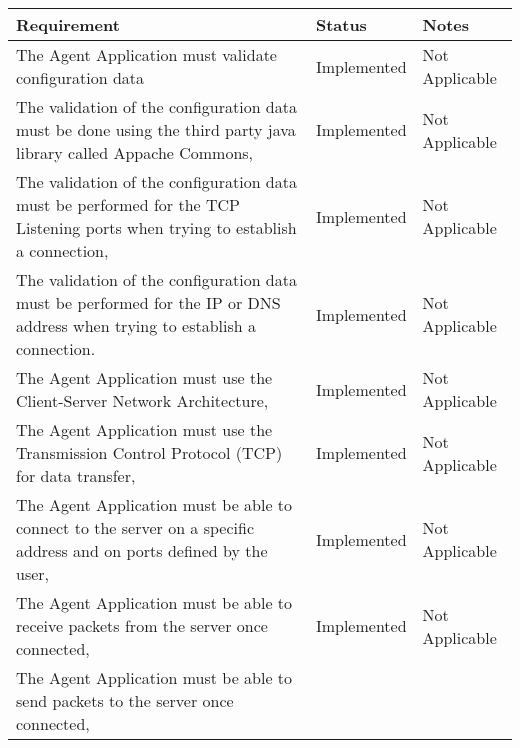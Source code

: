 \noindent
\begin{longtable}{
|p{}%
|p{}%
|p{}|%
}
    \hline
    \centering Requirement     & \centering Status     & \centering\arraybackslash Notes     \\ \hline
    The Agent Application must validate configuration data
                                                       & \centering Implemented        & Not Applicable   \\ \hline
    The validation of the configuration data must be done using the third party java library
    called Appache Commons,
                                                       & \centering Implemented        & Not Applicable    \\ \hline
    The validation of the configuration data must be performed for the TCP Listening ports when
    trying to establish a connection,
                                                       & \centering Implemented        & Not Applicable    \\ \hline
    The validation of the configuration data must be performed for the IP or DNS address when
    trying to establish a connection.
                                                       & \centering Implemented        & Not Applicable    \\ \hline
    The Agent Application must use the Client-Server Network Architecture,
                                                       & \centering Implemented         & Not Applicable   \\ \hline
    The Agent Application must use the Transmission Control Protocol (TCP) for data transfer,
                                                       & \centering Implemented         & Not Applicable   \\ \hline
    The Agent Application must be able to connect to the server on a specific address and
    on ports defined by the user,
                                                       & \centering Implemented         & Not Applicable   \\ \hline
    The Agent Application must be able to receive packets from the server once connected,
                                                       & \centering Implemented         & Not Applicable   \\ \hline
    The Agent Application must be able to send packets to the server once connected,

\end{longtable}
